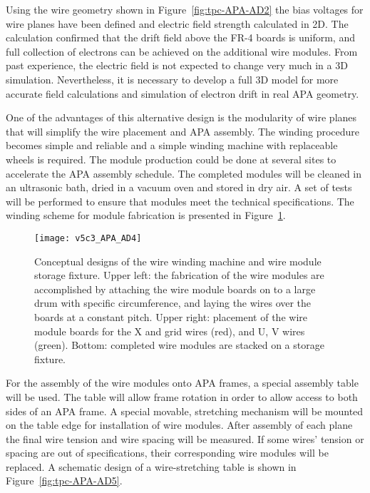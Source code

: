 Using the wire geometry shown in Figure~\ref{fig:tpc-APA-AD2} the bias voltages for wire planes have been defined and electric field strength calculated in 2D. The calculation confirmed that the drift field above the FR-4 boards is uniform, and full collection of electrons can be achieved on the additional wire modules. From past experience,  the electric field is not expected to change very much in a 3D simulation. Nevertheless, it is necessary to develop a full 3D model for more accurate field calculations and simulation of electron drift in real APA geometry.
  
One of the advantages of this alternative design is the modularity of wire planes that will simplify the wire placement and APA assembly. The winding procedure becomes simple and reliable and a simple winding machine with replaceable wheels is required. The module production could be done at several sites to accelerate the APA assembly schedule. The completed modules will be cleaned in an ultrasonic bath, dried in a vacuum oven and stored in dry air. A set of tests will be performed to ensure that modules meet the technical specifications. The winding scheme for module fabrication is presented in Figure~\ref{fig:tpc-APA-AD4}.
                              

\begin{figure}[htpb]
\centering
\texttt{[image: v5c3\_APA\_AD4]}
\caption[Conceptual designs of the wire winding machine and wire module storage fixture]{Conceptual designs of the wire winding machine and wire module storage fixture.  Upper left: the fabrication of the wire modules are accomplished by attaching the wire module boards on to a large drum with specific circumference, and laying the wires over the boards at a constant pitch.  Upper right: placement of the wire module boards for the X and grid wires (red), and U, V wires (green).  Bottom: completed wire modules are stacked on a storage fixture.   }
\label{fig:tpc-APA-AD4}
\end{figure}


For the assembly of the wire modules onto APA frames, a special assembly table will be used. The table will allow frame rotation in order to allow access to both sides of an APA frame. A special movable, 
stretching mechanism will be mounted on the table edge for installation of wire modules. After assembly of each plane the final wire tension and wire spacing will be measured. If some wires' tension or spacing 
are out of specifications, their corresponding wire modules will be replaced. A schematic design of a wire-stretching table is shown in Figure~\ref{fig:tpc-APA-AD5}. 
                                
